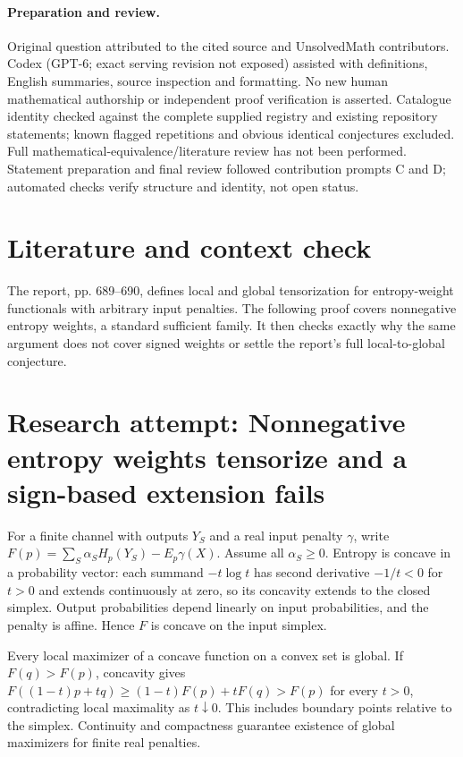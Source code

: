 \documentclass[11pt]{article}
\begin{document}
\paragraph{Preparation and review.}
Original question attributed to the cited source and UnsolvedMath contributors. Codex (GPT-6; exact serving revision not exposed) assisted with definitions, English summaries, source inspection and formatting. No new human mathematical authorship or independent proof verification is asserted. Catalogue identity checked against the complete supplied registry and existing repository statements; known flagged repetitions and obvious identical conjectures excluded. Full mathematical-equivalence/literature review has not been performed. Statement preparation and final review followed contribution prompts C and D; automated checks verify structure and identity, not open status.
\label{end:statement}

\section{Literature and context check}
The report, pp. 689--690, defines local and global tensorization for entropy-weight functionals with arbitrary input penalties. The following proof covers nonnegative entropy weights, a standard sufficient family. It then checks exactly why the same argument does not cover signed weights or settle the report's full local-to-global conjecture.
\section{Research attempt: Nonnegative entropy weights tensorize and a sign-based extension fails}
For a finite channel with outputs $Y_S$ and a real input penalty $\gamma$, write $F(p)=\sum_S\alpha_SH_p(Y_S)-E_p\gamma(X)$. Assume all $\alpha_S\ge0$. Entropy is concave in a probability vector: each summand $-t\log t$ has second derivative $-1/t<0$ for $t>0$ and extends continuously at zero, so its concavity extends to the closed simplex. Output probabilities depend linearly on input probabilities, and the penalty is affine. Hence $F$ is concave on the input simplex.

Every local maximizer of a concave function on a convex set is global. If $F(q)>F(p)$, concavity gives $F((1-t)p+tq)\ge(1-t)F(p)+tF(q)>F(p)$ for every $t>0$, contradicting local maximality as $t\downarrow0$. This includes boundary points relative to the simplex. Continuity and compactness guarantee existence of global maximizers for finite real penalties.
\end{document}
